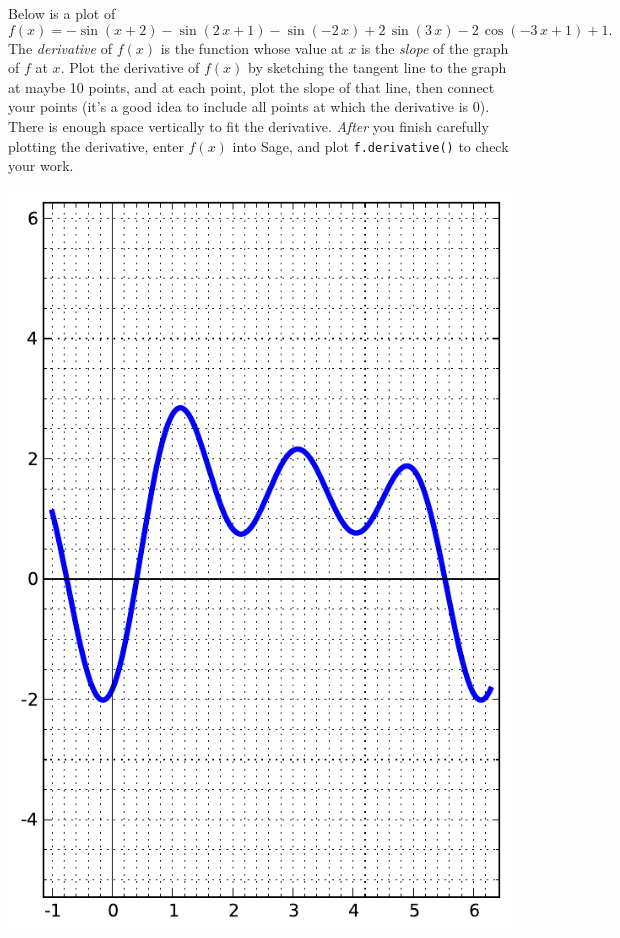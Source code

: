 Below is a plot of $$f(x)=-\sin\left(x + 2\right) - \sin\left(2 \, x + 1\right) - \sin\left(-2 \, x\right) + 2 \, \sin\left(3 \, x\right) - 2 \, \cos\left(-3 \, x + 1\right) + 1.$$  The {\em \color{red}derivative} of $f(x)$ is the function whose value at $x$ is the {\em slope} of the graph of $f$ at $x$.  Plot the derivative of $f(x)$ by sketching the tangent line to the graph at maybe 10 points, and at each point, plot the slope of that line, then connect your points (it's a good idea to include all points at which the derivative is 0).  There is enough space vertically to fit the derivative.  {\em After} you finish carefully plotting the derivative, enter $f(x)$ into Sage, and plot {\color{blue}\verb|f.derivative()|} to check your work.
\begin{center}\includegraphics{functions/3.pdf}\end{center}\newpage

